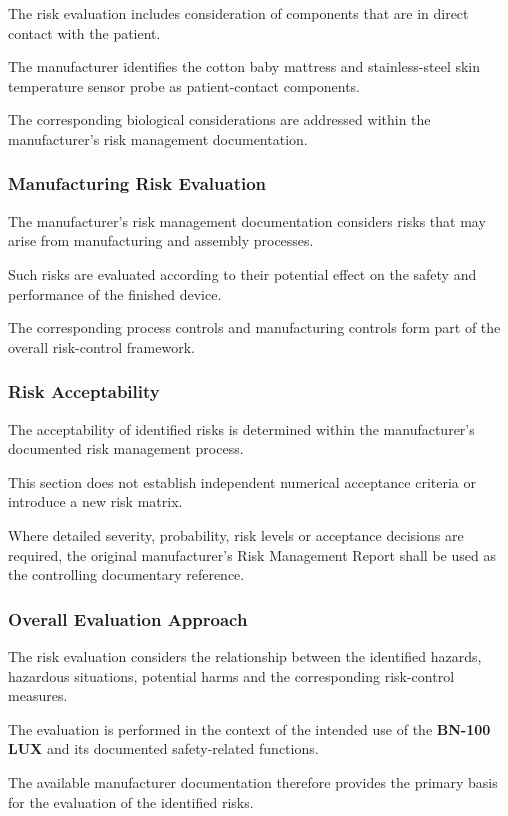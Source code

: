 The risk evaluation includes consideration of components that are in direct
contact with the patient.

The manufacturer identifies the cotton baby mattress and stainless-steel
skin temperature sensor probe as patient-contact components.

The corresponding biological considerations are addressed within the
manufacturer's risk management documentation.

\subsubsection{Manufacturing Risk Evaluation}

The manufacturer's risk management documentation considers risks that may
arise from manufacturing and assembly processes.

Such risks are evaluated according to their potential effect on the safety
and performance of the finished device.

The corresponding process controls and manufacturing controls form part of
the overall risk-control framework.

\subsubsection{Risk Acceptability}

The acceptability of identified risks is determined within the
manufacturer's documented risk management process.

This section does not establish independent numerical acceptance criteria or
introduce a new risk matrix.

Where detailed severity, probability, risk levels or acceptance decisions
are required, the original manufacturer's Risk Management Report shall be
used as the controlling documentary reference.

\subsubsection{Overall Evaluation Approach}

The risk evaluation considers the relationship between the identified
hazards, hazardous situations, potential harms and the corresponding
risk-control measures.

The evaluation is performed in the context of the intended use of the
\textbf{BN-100 LUX} and its documented safety-related functions.

The available manufacturer documentation therefore provides the primary
basis for the evaluation of the identified risks.

